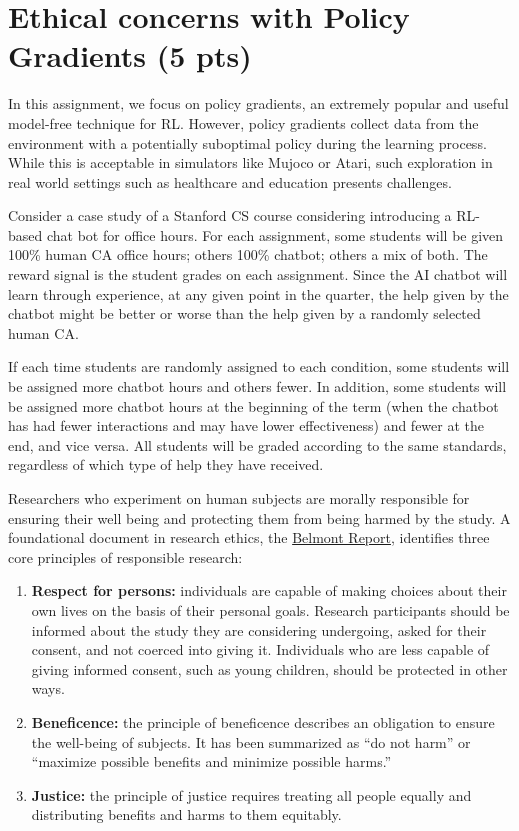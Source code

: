 \documentclass{article}
\begin{document}
\newpage
\section{Ethical concerns with Policy Gradients (5 pts)}
In this assignment, we focus on policy gradients, an extremely popular and useful model-free technique for RL. However, policy gradients collect data from the environment with a potentially suboptimal policy during the learning process. While this is acceptable in simulators like Mujoco or Atari, such exploration in real world settings such as healthcare and education presents challenges. 

Consider a case study of a Stanford CS course considering introducing a RL-based chat bot for office hours.  For each assignment, some students will be given 100\% human CA office hours; others 100\% chatbot; others a mix of both. The reward signal is the student grades on each assignment. Since the AI chatbot will learn through experience, at any given point in the quarter, the help given by the chatbot might be better or worse than the help given by a randomly selected human CA.  

If each time students are randomly assigned to each condition, some students will be assigned more chatbot hours and others fewer. In addition, some students will be assigned more chatbot hours at the beginning of the term (when the chatbot has had fewer interactions and may have lower effectiveness)  and fewer at the end, and vice versa.  All students will be graded according to the same standards, regardless of which type of help they have received.  

Researchers who experiment on human subjects are morally responsible for ensuring their well being and protecting them from being harmed by the study. A foundational document in research ethics, the \href{https://www.hhs.gov/ohrp/regulations-and-policy/belmont-report/read-the-belmont-report/index.html#xethical}{Belmont Report}, identifies three core principles of responsible research:

\begin{enumerate}
    \item \textbf{Respect for persons:} individuals are capable of making choices about their own lives on the basis of their personal goals. Research participants should be informed about the study they are considering undergoing, asked for their consent, and not coerced into giving it. Individuals who are less capable of giving informed consent, such as young children, should be protected in other ways.
    \item \textbf{Beneficence:} the principle of beneficence describes an obligation to ensure the well-being of subjects. It has been summarized as “do not harm” or “maximize possible benefits and minimize possible harms.”
    \item \textbf{Justice:} the principle of justice requires treating all people equally and distributing benefits and harms to them equitably. 
\end{enumerate}
\end{document}
